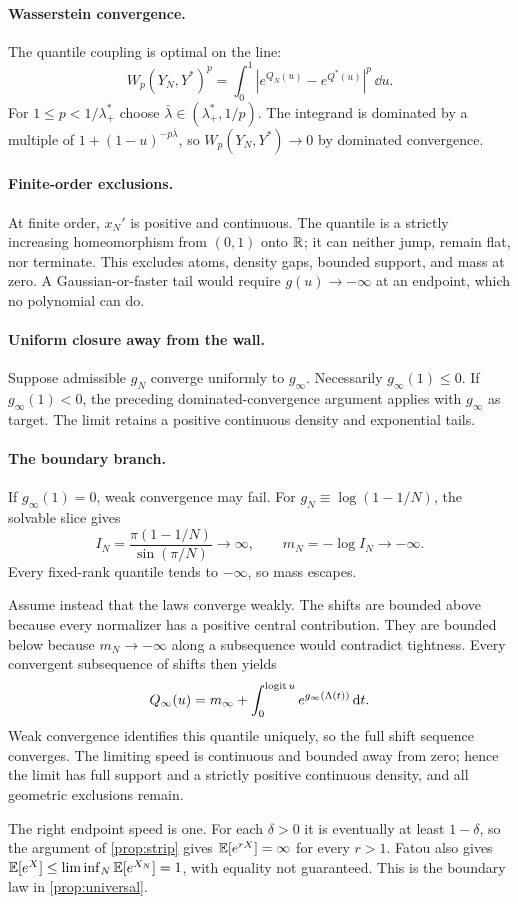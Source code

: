 \paragraph{Wasserstein convergence.}
The quantile coupling is optimal on the line:
\[
W_p(Y_N,Y^*)^p=\int_0^1|e^{Q_N(u)}-e^{Q^*(u)}|^p\,\dd u.
\]
For $1\le p<1/\lambda_+^*$ choose
$\bar\lambda\in(\lambda_+^*,1/p)$.  The integrand is dominated by a
multiple of $1+(1-u)^{-p\bar\lambda}$, so $W_p(Y_N,Y^*)\to0$ by dominated
convergence.

\paragraph{Finite-order exclusions.}
At finite order, $x_N'$ is positive and continuous.  The quantile is a
strictly increasing homeomorphism from $(0,1)$ onto $\mathbb{R}$; it can neither
jump, remain flat, nor terminate.  This excludes atoms, density gaps, bounded
support, and mass at zero.  A Gaussian-or-faster tail would require
$g(u)\to-\infty$ at an endpoint, which no polynomial can do.

\paragraph{Uniform closure away from the wall.}
Suppose admissible $g_N$ converge uniformly to $g_\infty$.  Necessarily
$g_\infty(1)\le0$.  If $g_\infty(1)<0$, the preceding dominated-convergence
argument applies with $g_\infty$ as target.  The limit retains a positive
continuous density and exponential tails.

\paragraph{The boundary branch.}
If $g_\infty(1)=0$, weak convergence may fail.  For
$g_N\equiv\log(1-1/N)$, the solvable slice gives
\[
I_N=\frac{\pi(1-1/N)}{\sin(\pi/N)}\longrightarrow\infty,
\qquad m_N=-\log I_N\longrightarrow-\infty.
\]
Every fixed-rank quantile tends to $-\infty$, so mass escapes.

Assume instead that the laws converge weakly.  The shifts are bounded above
because every normalizer has a positive central contribution.  They are
bounded below because $m_N\to-\infty$ along a subsequence would contradict
tightness.  Every convergent subsequence of shifts then yields
\[
Q_\infty(u)=m_\infty+
\int_0^{\operatorname{logit} u}e^{g_\infty(\Lambda(t))}\,\mathrm{d} t.
\]
Weak convergence identifies this quantile uniquely, so the full shift
sequence converges.  The limiting speed is continuous and bounded away from
zero; hence the limit has full support and a strictly positive continuous
density, and all geometric exclusions remain.

The right endpoint speed is one.  For each $\delta>0$ it is eventually at
least $1-\delta$, so the argument of \cref{prop:strip} gives
$\mathbb{E}[e^{rX}]=\infty$ for every $r>1$.  Fatou also gives
$\mathbb{E}[e^X]\le\liminf_N\mathbb{E}[e^{X_N}]=1$, with equality not guaranteed.  This is
the boundary law in \cref{prop:universal}.
